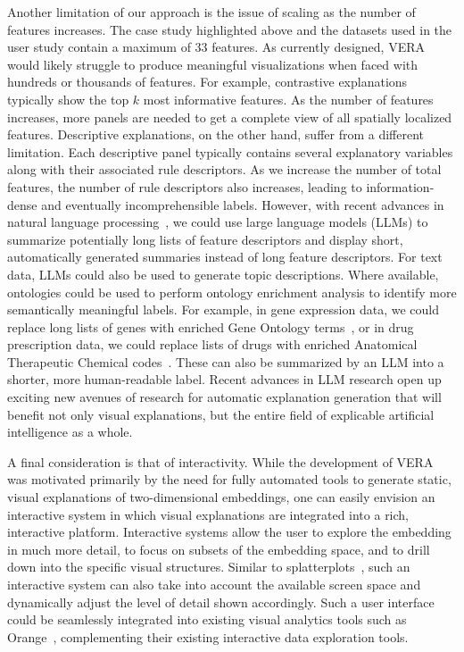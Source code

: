\documentclass[lettersize,journal]{IEEEtran}
\begin{document}
Another limitation of our approach is the issue of scaling as the number of features increases.
The case study highlighted above and the datasets used in the user study contain a maximum of 33 features. As currently designed, VERA would likely struggle to produce meaningful visualizations when faced with hundreds or thousands of features.
For example, contrastive explanations typically show the top $k$ most informative features. As the number of features increases, more panels are needed to get a complete view of all spatially localized features.
Descriptive explanations, on the other hand, suffer from a different limitation. Each descriptive panel typically contains several explanatory variables along with their associated rule descriptors. As we increase the number of total features, the number of rule descriptors also increases, leading to information-dense and eventually incomprehensible labels.
However, with recent advances in natural language processing~\cite{Brown2020,Touvron2023}, we could use large language models (LLMs) to summarize potentially long lists of feature descriptors and display short, automatically generated summaries instead of long feature descriptors. For text data, LLMs could also be used to generate topic descriptions. Where available, ontologies could be used to perform ontology enrichment analysis to identify more semantically meaningful labels. For example, in gene expression data, we could replace long lists of genes with enriched Gene Ontology terms~\cite{GeneOntology2004}, or in drug prescription data, we could replace lists of drugs with enriched Anatomical Therapeutic Chemical codes~\cite{Policar2023}. These can also be summarized by an LLM into a shorter, more human-readable label.
Recent advances in LLM research open up exciting new avenues of research for automatic explanation generation that will benefit not only visual explanations, but the entire field of explicable artificial intelligence as a whole.

A final consideration is that of interactivity. While the development of VERA was motivated primarily by the need for fully automated tools to generate static, visual explanations of two-dimensional embeddings, one can easily envision an interactive system in which visual explanations are integrated into a rich, interactive platform.
Interactive systems allow the user to explore the embedding in much more detail, to focus on subsets of the embedding space, and to drill down into the specific visual structures.
Similar to splatterplots~\cite{MayorgaGleicher2013}, such an interactive system can also take into account the available screen space and dynamically adjust the level of detail shown accordingly.
Such a user interface could be seamlessly integrated into existing visual analytics tools such as Orange~\cite{Demsar2013}, complementing their existing interactive data exploration tools.
\end{document}
